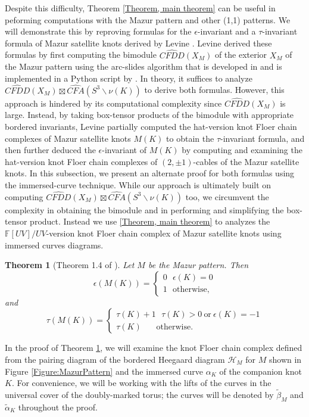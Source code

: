 \documentclass{amsart}
\newtheorem{thm}{Theorem}[section]
\theoremstyle{definition}
\theoremstyle{remark}
\numberwithin{equation}{section}
\numberwithin{equation}{section} \makeatletter
\begin{document}
Despite this difficulty, Theorem \ref{Theorem, main theorem} can be useful in peforming computations with the Mazur pattern and other (1,1) patterns. We will demonstrate this by reproving formulas for the $\epsilon$-invariant and a $\tau$-invariant formula of Mazur satellite knots derived by Levine \cite{MR3589337}. Levine derived these formulas by first computing the bimodule $\widehat{CFDD}(X_M)$ of the exterior $X_M$ of the Mazur pattern using the arc-slides algorithm that is developed in \cite{Lipshitz2014b} and is implemented in a Python script by \cite{Zhan}. In theory, it suffices to analyze $\widehat{CFDD}(X_M)\boxtimes \widehat{CFA}(S^3\backslash \nu(K))$ to derive both formulas. However, this approach is hindered by its computational complexity since $\widehat{CFDD}(X_M)$ is large. Instead, by taking box-tensor products of the bimodule with appropriate bordered invariants, Levine partially computed the hat-version knot Floer chain complexes of Mazur satellite knots $M(K)$ to obtain the $\tau$-invariant formula, and then further deduced the $\epsilon$-invariant of $M(K)$ by computing and examining the hat-version knot Floer chain complexes of $(2,\pm 1)$-cables of the Mazur satellite knots. In this subsection, we present an alternate proof for both formulas using the immersed-curve technique. While our approach is ultimately built on computing $\widehat{CFDD}(X_M)\boxtimes \widehat{CFA}(S^3\backslash \nu(K))$ too, we circumvent the complexity in obtaining the bimodule and in performing and simplifying the box-tensor product. Instead we use \ref{Theorem, main theorem} to analyzes the $\mathbb{F}[UV]/UV$-version knot Floer chain complex of Mazur satellite knots using immersed curves diagrams.


\begin{thm}[Theorem 1.4 of \cite{MR3589337}]\label{Theorem: epsilon_of Mazur_satellites}
	Let $M$ be the Mazur pattern. Then $$
	\epsilon(M(K))=
	\begin{cases}
		0 \ \ \ \epsilon(K)=0\\
		1 \ \ \ \text{otherwise}, 
	\end{cases}
	$$
	and 
	$$
	\tau(M(K))=
	\begin{cases}
		\tau(K)+1 \ \ \ \tau(K)>0\ \text{or}\ \epsilon(K)=-1\\
		\tau(K) \ \ \ \ \ \ \ \ \text{otherwise}. 
	\end{cases}
	$$
\end{thm}

In the proof of Theorem \ref{Theorem: epsilon_of Mazur_satellites}, we will examine the knot Floer chain complex defined from the pairing diagram of the bordered Heegaard diagram $\mathcal{H}_M$ for $M$ shown in Figure \ref{Figure:MazurPattern} and the immersed curve $\alpha_K$ of the companion knot $K$. For convenience, we will be working with the lifts of the curves in the universal cover of the doubly-marked torus; the curves will be denoted by $\tilde{\beta}_M$ and $\tilde{\alpha}_K$ throughout the proof. 
\end{document}
